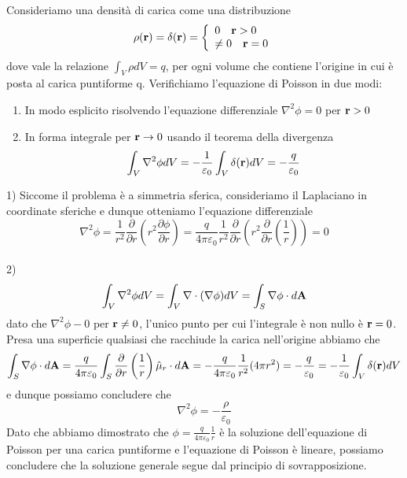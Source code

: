 Consideriamo una densit\`a di carica come una distribuzione
\begin{equation*}
	\rho(\bold{r}) = \delta(\bold{r}) = \left \{ \begin{array}{l}
		0 \quad  \bold{r} > 0 \\
		\neq 0 \quad \bold{r} = 0
	\end{array}\right.
\end{equation*}
dove vale la relazione $\int_{V}\rho dV = q$, per ogni volume che contiene l'origine in cui \`e posta al carica puntiforme q.
Verifichiamo l'equazione di Poisson in due modi:
\begin{enumerate}
	\item In modo esplicito risolvendo l'equazione differenziale $\nabla^2\phi = 0$ per $\bold{r} > 0$
	\item In forma integrale per $\bold{r} \to 0$ usando il teorema della divergenza 
	\begin{equation*}
		\int_{V} \nabla^2\phi dV = -\frac{1}{\varepsilon_0}\int_{V} \delta(\bold{r})dV = -\frac{q}{\varepsilon_0}
	\end{equation*}
\end{enumerate}
1) Siccome il problema \`e a simmetria sferica, consideriamo il Laplaciano in coordinate sferiche e dunque otteniamo l'equazione differenziale
\begin{equation*}
	\nabla^2\phi = \frac{1}{r^2}\frac{\partial }{\partial r} \left (r^2 \frac{\partial \phi}{\partial r} \right) = \frac{q}{4 \pi \varepsilon_0} \frac{1}{r^2} \frac{\partial }{\partial r} \left ( r^2 \frac{\partial}{\partial r} \left ( \frac{1}{r}\right)\right )= 0
\end{equation*}
\\
2)\begin{equation*}
	\int_{V} \nabla^2\phi dV = \int_{V}\nabla \cdot (\nabla \phi) dV = \int_{S}\nabla \phi \cdot d\bold{A}
\end{equation*}
dato che $\nabla^2\phi - 0$ per $\bold{r} \neq 0$, l'unico punto per cui l'integrale \`e non nullo \`e $\bold{r} = 0$. Presa una superficie qualsiasi che racchiude la carica nell'origine abbiamo che
\begin{equation*}
	\int_{S} \nabla \phi \cdot d \bold{A} =  \frac{q}{4 \pi \varepsilon_0}\int_{S} \frac{\partial}{\partial r} \left (\frac{1}{r} \right)\hat{\mu}_{r} \cdot d\bold{A} = - \frac{q}{4 \pi \varepsilon_0} \frac{1}{r^2} (4 \pi r^2)= - \frac{q}{\varepsilon_0} = - \frac{1}{\varepsilon_0}\int_{V} \delta(\bold{r}) dV
\end{equation*} 
e dunque possiamo concludere che 
\begin{equation*}
	\nabla^2\phi = - \frac{\rho}{\varepsilon_0}
\end{equation*}
Dato che abbiamo dimostrato che $\phi = \frac{q}{4 \pi \varepsilon_0} \frac{1}{r}$ \`e la soluzione dell'equazione di Poisson per una carica puntiforme e l'equazione di Poisson \`e lineare, possiamo concludere che la soluzione generale segue dal principio di sovrapposizione.


